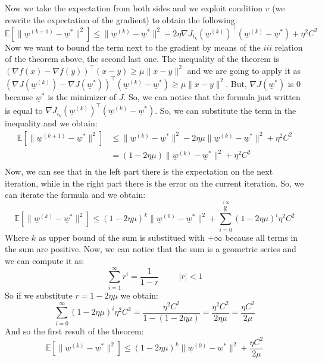 Now we take the expectation from both sides and we exploit condition $v$ (we rewrite the expectation of the gradient) to obtain the following:
\[
    \mathbb{E}[ \| \underline{w}^{(k+1)} - \underline{w}^*\|^2] \leq \| \underline{w}^{(k)} - \underline{w}^*\|^2 - 2\eta \nabla J_{i_k}(\underline{w}^{(k)})^\intercal (\underline{w}^{(k)} - \underline{w}^*)+ \eta^2 C^2
\]
Now we want to bound the term next to the gradient by means of the $iii$ relation of the theorem above, the second last one. The inequality of the theorem is $(\nabla f(x) - \nabla f(y))^\intercal (x-y) \geq \mu \|x-y\|^2$ and we are going to apply it as $(\nabla J(\underline{w}^{(k)}) - \nabla J(\underline{w}^{*}))^\intercal (\underline{w}^{(k)}-\underline{w}^*)\geq \mu \|x-y\|^2$. But, $\nabla J(\underline{w}^{*})$ is 0 because $\underline{w}^*$ is the minimizer of $J$. So, we can notice that the formula just written is equal to $\nabla J_{i_k}(\underline{w}^{(k)})^\intercal (\underline{w}^{(k)} - \underline{w}^*)$. So, we can substitute the term in the inequality and we obtain:
\[
    \begin{split}
        \mathbb{E}[ \| \underline{w}^{(k+1)} - \underline{w}^*\|^2] &\leq \| \underline{w}^{(k)} - \underline{w}^*\|^2 - 2\eta \mu \| \underline{w}^{(k)} - \underline{w}^*\|^2+ \eta^2 C^2\\
        &= (1-2\eta \mu) \| \underline{w}^{(k)} - \underline{w}^*\|^2 + \eta^2 C^2\\
    \end{split}
\]
Now, we can see that in the left part there is the expectation on the next iteration, while in the right part there is the error on the current iteration. So, we can iterate the formula and we obtain:
\[
    \mathbb{E}[ \| \underline{w}^{(k)} - \underline{w}^*\|^2] \leq (1-2\eta \mu)^k \| \underline{w}^{(0)} - \underline{w}^*\|^2 + \sum_{i=0}^{\overset{+\infty}{\not k}} (1-2\eta \mu)^i \eta^2 C^2
\]
Where $k$ as upper bound of the sum is substitued with $+\infty$ because all terms in the sum are positive. Now, we can notice that the sum is a geometric series and we can compute it as:
\[
    \sum_{i=1}^{\infty} r^i = \dfrac{1}{1-r} \hspace{1cm} |r|<1    
\]
So if we substitute $r = 1-2\eta \mu$ we obtain:
\[
    \sum_{i=0}^{\infty} (1-2\eta \mu)^i \eta^2 C^2 = \dfrac{\eta^2 C^2}{1-(1-2\eta \mu)} = \dfrac{\eta^2 C^2}{2\eta \mu} = \dfrac{\eta C^2}{2\mu}    
\]
And so the first result of the theorem:
\[
    \mathbb{E}[ \| \underline{w}^{(k)} - \underline{w}^*\|^2] \leq (1-2\eta \mu)^k \| \underline{w}^{(0)} - \underline{w}^*\|^2 + \dfrac{\eta C^2}{2\mu}
\]


